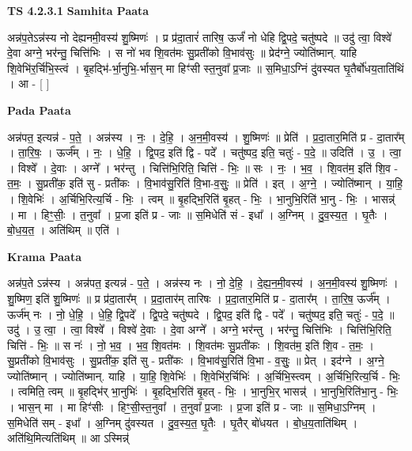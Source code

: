 \documentclass[17pt]{extarticle}
\begin{document}
\textbf{TS 4.2.3.1 } \newline
\textbf{Samhita Paata} \newline

अन्न॑प॒तेऽन्न॑स्य नो देह्यनमी॒वस्य॑ शु॒ष्मिणः॑ । प्र प्र॑दा॒तारं॑ तारिष॒ ऊर्जं॑ नो धेहि द्वि॒पदे॒ चतु॑ष्पदे ॥ उदु॑ त्वा॒ विश्वे॑ दे॒वा अग्ने॒ भर॑न्तु॒ चित्ति॑भिः । स नो॑ भव शि॒वत॑मः सु॒प्रती॑को वि॒भाव॑सुः ॥ प्रेद॑ग्ने॒ ज्योति॑ष्मान्. याहि शि॒वेभि॑र॒र्चि॑भि॒स्त्वं । बृ॒हद्भि॑-र्भा॒नुभि॒-र्भास॒न् मा हिꣳ॑सी स्त॒नुवा᳚ प्र॒जाः ॥ स॒मिधा॒ऽग्निं दु॑वस्यत घृ॒तैर्बो॑धय॒ताति॑थिं । आ - [  ] \newline

\textbf{Pada Paata} \newline

अन्न॑पत॒ इत्यन्न॑ - प॒ते॒ । अन्न॑स्य । नः॒ । दे॒हि॒ । अ॒न॒मी॒वस्य॑ । शु॒ष्मिणः॑ ॥ प्रेति॑ । प्र॒दा॒तार॒मिति॑ प्र - दा॒तार᳚म् । ता॒रि॒षः॒ । ऊर्ज᳚म् । नः॒ । धे॒हि॒ । द्वि॒पद॒ इति॑ द्वि - पदे᳚ । चतु॑ष्पद॒ इति॒ चतुः॑ - प॒दे॒ ॥ उदिति॑ । उ॒ । त्वा॒ । विश्वे᳚ । दे॒वाः । अग्ने᳚ । भर॑न्तु । चित्ति॑भि॒रिति॒ चित्ति॑ - भिः॒ ॥ सः । नः॒ । भ॒व॒ । शि॒वत॑म॒ इति॑ शि॒व - त॒मः॒ । सु॒प्रती॑क॒ इति॑ सु - प्रती॑कः । वि॒भाव॑सु॒रिति॑ वि॒भा-व॒सुः॒ ॥ प्रेति॑ । इत् । अ॒ग्ने॒ । ज्योति॑ष्मान् । या॒हि॒ । शि॒वेभिः॑ । अ॒र्चिभि॒रित्य॒र्चि - भिः॒ । त्वम् ॥ बृ॒हद्भि॒रिति॑ बृ॒हत् - भिः॒ । भा॒नुभि॒रिति॑ भा॒नु - भिः॒ । भासन्न्॑ । मा । हिꣳ॒॒सीः॒ । त॒नुवा᳚ । प्र॒जा इति॑ प्र - जाः ॥ स॒मिधेति॑ सं - इधा᳚ । अ॒ग्निम् । दु॒व॒स्य॒त॒ । घृ॒तैः । बो॒ध॒य॒त॒ । अति॑थिम् ॥ एति॑ ।  \newline


\textbf{Krama Paata} \newline

अन्न॑प॒ते ऽन्न॑स्य । अन्न॑पत॒ इत्यन्न॑ - प॒ते॒ । अन्न॑स्य नः । नो॒ दे॒हि॒ । दे॒ह्य॒न॒मी॒वस्य॑ । अ॒न॒मी॒वस्य॑ शु॒ष्मिणः॑ । शु॒ष्मिण॒ इति॑ शु॒ष्मिणः॑ ॥ प्र प्र॑दा॒तार᳚म् । प्र॒दा॒तार॑म् तारिषः । प्र॒दा॒तार॒मिति॑ प्र - दा॒तार᳚म् । ता॒रि॒ष॒ ऊर्ज᳚म् । ऊर्ज॑म् नः । नो॒ धे॒हि॒ । धे॒हि॒ द्वि॒पदे᳚ । द्वि॒पदे॒ चतु॑ष्पदे । द्वि॒पद॒ इति॑ द्वि - पदे᳚ । चतु॑ष्पद॒ इति॒ चतुः॑ - प॒दे॒ ॥ उदु॑ । उ॒ त्वा॒ । त्वा॒ विश्वे᳚ । विश्वे॑ दे॒वाः । दे॒वा अग्ने᳚ । अग्ने॒ भर॑न्तु । भर॑न्तु॒ चित्ति॑भिः । चित्ति॑भि॒रिति॒ चित्ति॑ - भिः॒ ॥ स नः॑ । नो॒ भ॒व॒ । भ॒व॒ शि॒वत॑मः । शि॒वत॑मः सु॒प्रती॑कः । शि॒वत॑म॒ इति॑ शि॒व - त॒मः॒ । सु॒प्रती॑को वि॒भाव॑सुः । सु॒प्रती॑क॒ इति॑ सु - प्रती॑कः । वि॒भाव॑सु॒रिति॑ वि॒भा - व॒सुः॒ ॥ प्रेत् । इद॑ग्ने । अ॒ग्ने॒ ज्योति॑ष्मान् । ज्योति॑ष्मान्. याहि । या॒हि॒ शि॒वेभिः॑ । शि॒वेभि॑र॒र्चिभिः॑ । अ॒र्चिभि॒स्त्वम् । अ॒र्चिभि॒रित्य॒र्चि - भिः॒ । त्वमिति॒ त्वम् ॥ बृ॒हद्भि॑र् भा॒नुभिः॑ । बृ॒हद्भि॒रिति॑ बृ॒हत् - भिः॒ । भा॒नुभि॒र् भासन्न्॑ । भा॒नुभि॒रिति॑भा॒नु - भिः॒ । भास॒न् मा । मा हिꣳ॑सीः । हिꣳ॒॒सी॒स्त॒नुवा᳚ । त॒नुवा᳚ प्र॒जाः । प्र॒जा इति॑ प्र - जाः ॥ स॒मिधा॒ऽग्निम् । स॒मिधेति॑ सम् - इधा᳚ । अ॒ग्निम् दु॑वस्यत । दु॒व॒स्य॒त॒ घृ॒तैः । घृ॒तैर् बो॑धयत । बो॒ध॒य॒ताति॑थिम् । अति॑थि॒मित्यति॑थिम् ॥ आ ऽस्मिन्न्॑ \newline
\end{document}
